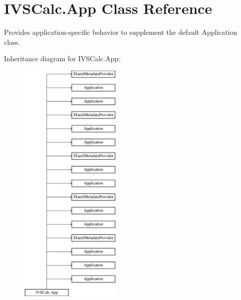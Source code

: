 \hypertarget{class_i_v_s_calc_1_1_app}{}\section{I\+V\+S\+Calc.\+App Class Reference}
\label{class_i_v_s_calc_1_1_app}


Provides application-\/specific behavior to supplement the default Application class.  


Inheritance diagram for I\+V\+S\+Calc.\+App\+:\begin{figure}[H]
\begin{center}
\leavevmode
\includegraphics[height=12.000000cm]{class_i_v_s_calc_1_1_app}
\end{center}
\end{figure}

